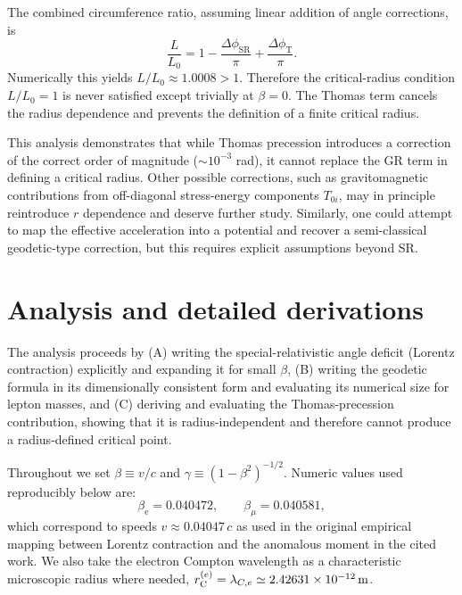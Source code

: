\documentclass[%
 reprint,
 amsmath,amssymb,
 aps,
]{revtex4-1}
\numberwithin{equation}{section}
\begin{document}
The combined circumference ratio, assuming linear addition of angle corrections, is
\begin{equation}
\frac{L}{L_0} = 1 - \frac{\Delta \phi_{\mathrm{SR}}}{\pi} + \frac{\Delta \phi_{\mathrm{T}}}{\pi}.
\end{equation}
Numerically this yields $L/L_0 \approx 1.0008 > 1$. 
Therefore the critical-radius condition $L/L_0=1$ is never satisfied except trivially at $\beta=0$. 
The Thomas term cancels the radius dependence and prevents the definition of a finite critical radius. 

This analysis demonstrates that while Thomas precession introduces a correction of the correct order of magnitude 
($\sim 10^{-3}$ rad), it cannot replace the GR term in defining a critical radius. 
Other possible corrections, such as gravitomagnetic contributions from off-diagonal stress-energy components $T_{0i}$, 
may in principle reintroduce $r$ dependence and deserve further study. 
Similarly, one could attempt to map the effective acceleration into a potential and 
recover a semi-classical geodetic-type correction, but this requires explicit assumptions beyond SR.

\section{Analysis and detailed derivations}

The analysis proceeds by (A) writing the special-relativistic angle deficit (Lorentz contraction) explicitly and expanding it for small $\beta$, (B) writing the geodetic formula in its dimensionally consistent form and evaluating its numerical size for lepton masses, and (C) deriving and evaluating the Thomas-precession contribution, showing that it is radius-independent and therefore cannot produce a radius-defined critical point.

Throughout we set $\beta\equiv v/c$ and $\gamma\equiv(1-\beta^{2})^{-1/2}$. Numeric values used reproducibly below are:
\[
\beta_{\mathrm{e}}=0.040472,\qquad \beta_{\mu}=0.040581,
\]
which correspond to speeds $v\approx 0.04047\,c$ as used in the original empirical mapping between Lorentz contraction and the anomalous moment in the cited work. We also take the electron Compton wavelength as a characteristic microscopic radius where needed, $r_{\rm C}^{(e)}=\lambda_{C,e}\simeq 2.42631\times10^{-12}\,\mathrm{m}$.
\end{document}
